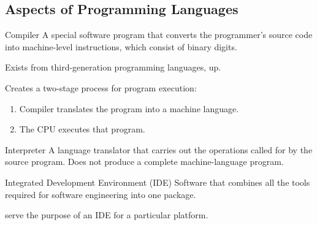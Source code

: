 \documentclass[\main/notes.tex]{subfiles}
\begin{document}
			\subsection{Aspects of Programming Languages}
				\begin{definition}{Compiler}
					A special software program that converts the programmer's source code into machine-level instructions, which consist of binary digits.

					Exists from third-generation programming languages, up.

					Creates a two-stage process for program execution:
					\begin{enumerate}
						\item Compiler translates the program into a machine language.
						\item The CPU executes that program.
					\end{enumerate}
				\end{definition}
				\begin{definition}{Interpreter}
					A language translator that carries out the operations called for by the source program. Does not produce a complete machine-language program.
				\end{definition}
				\begin{definition}{Integrated Development Environment (IDE)}
					Software that combines all the tools required for software engineering into one package.

					 serve the purpose of an IDE for a particular platform.
				\end{definition}
	\vbox{}
\end{document}
